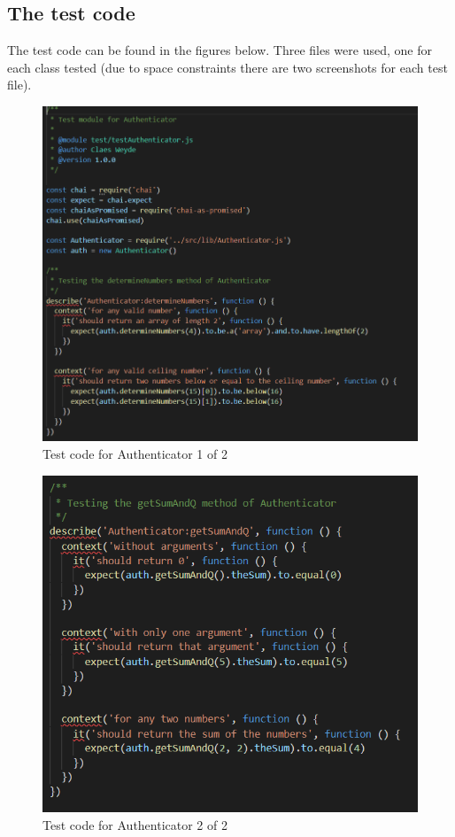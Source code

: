 \documentclass[12pt, letterpaper]{article}
\begin{document}
\subsection{The test code}
The test code can be found in the figures below. Three files were used, one for each class tested (due to space constraints there are two screenshots for each test file).
\begin{figure}[H]\label{fig:code11}
	\includegraphics{code1_1}
	\caption{Test code for Authenticator 1 of 2}
	\centering
\end{figure}
\begin{figure}[H]\label{fig:code12}
	\includegraphics{code1_2}
	\caption{Test code for Authenticator 2 of 2}
	\centering
\end{figure}
\end{document}
